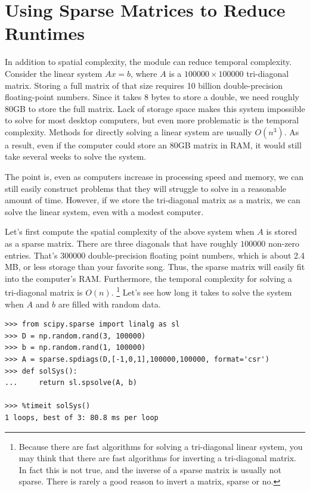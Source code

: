\section*{Using Sparse Matrices to Reduce Runtimes}
In addition to spatial complexity, the  module can reduce temporal complexity. 
Consider the linear system $A x = b$, where $A$ is a $100000\times 100000$ tri-diagonal matrix.
Storing a full matrix of that size requires 10 billion double-precision floating-point numbers. 
Since it takes 8 bytes to store a double, we need roughly 80GB to store the full matrix. 
Lack of storage space makes this system impossible to solve for most desktop computers, but even more problematic is the temporal complexity. 
Methods for directly solving a linear system are usually $O(n^3)$. 
As a result, even if the computer could store an 80GB matrix in RAM, it would still take several weeks to solve the system. 

The point is, even as computers increase in processing speed and memory, we can still easily construct problems that they will struggle to solve in a reasonable amount of time. 
However, if we store the tri-diagonal matrix as a  matrix, we can solve the linear system, even with a modest computer. 

Let's first compute the spatial complexity of the above system when $A$ is stored as a sparse matrix. 
There are three diagonals that have roughly $100000$ non-zero entries. 
That's $300000$ double-precision floating point numbers, which is about 2.4 MB, or less storage than your favorite song. 
Thus, the sparse matrix will easily fit into the computer's RAM. Furthermore, the temporal complexity for solving a tri-diagonal matrix is $O(n)$.
\footnote{Because there are fast algorithms for solving a tri-diagonal linear system, you may think that there are fast algorithms for inverting a tri-diagonal matrix. 
In fact this is not true, and the inverse of a sparse matrix is usually not sparse. 
There is rarely a good reason to invert a matrix, sparse or no.} 
Let's see how long it takes to solve the system when $A$ and $b$ are filled with random data.

\begin{lstlisting}
>>> from scipy.sparse import linalg as sl
>>> D = np.random.rand(3, 100000)
>>> b = np.random.rand(1, 100000)
>>> A = sparse.spdiags(D,[-1,0,1],100000,100000, format='csr')
>>> def solSys():
...     return sl.spsolve(A, b)

>>> %timeit solSys()
1 loops, best of 3: 80.8 ms per loop

\end{lstlisting}

